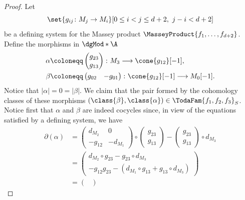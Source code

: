 \documentclass[a4paper]{amsart}
\begin{document}
\begin{proof}
  Let
  \[
    \set{g_{ij}\colon M_j\to M_i}[0\leq i<j\leq d+2,\ j-i<d+2]
  \]
  be a defining system for the Massey product
  $\MasseyProduct{f_1,\dots,f_{d+2}}$. Define the morphisms in $\dgMod*{\A}$
  \begin{align*}
    \alpha & \coloneqq\begin{pmatrix}g_{23}\\g_{13}\end{pmatrix}\colon M_3\longrightarrow \cone{g_{12}}[-1], \\
    \beta  & \coloneqq\begin{pmatrix}g_{02}&-g_{01}\end{pmatrix}\colon \cone{g_{12}}[-1]\longrightarrow M_0[-1].
  \end{align*}
  Notice that $|\alpha|=0=|\beta|$. We claim that the pair formed by the
  cohomology classes of these morphisms
  $(\class{\beta},\class{\alpha})\in\TodaFam{f_1,f_2,f_3}_S$. Notice first that
  $\alpha$ and $\beta$ are indeed cocycles since, in view of the equations
  satisfied by a defining system, we have
  \begin{align*}
    \partial(\alpha) & =                                                                      %
                       \begin{pmatrix}
                         d_{M_2} & 0 \\ -g_{12} & -d_{M_1}
                       \end{pmatrix}\circ%
                       \begin{pmatrix}
                         g_{23} \\ g_{13}
                       \end{pmatrix}-%
                       \begin{pmatrix}
                         g_{23} \\ g_{13}
                       \end{pmatrix}\circ d_{M_3}                                                                \\
                     & =\begin{pmatrix}
                          d_{M_2}\circ g_{23}-g_{23}\circ d_{M_3} \\ -g_{12}g_{23}-(d_{M_1}\circ
                          g_{13}+g_{13}\circ d_{M_3})
                        \end{pmatrix} \\
                     & =\begin{pmatrix}

\end{pmatrix}
\end{align*}
\end{proof}
\end{document}
